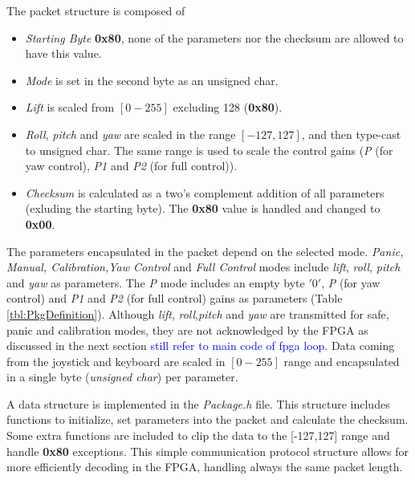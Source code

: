 \documentclass{article}
\newcommand\todo[1]{\textcolor{blue}{#1}} %
\begin{document}
The packet structure is composed of
\begin{itemize}

\item{\emph{Starting Byte} \textbf{0x80}, none of the parameters nor the checksum are allowed to have this value.}

\item{\emph{Mode} is set in the second byte as an unsigned char.}

\item{\emph{Lift} is scaled from $[0-255]$ excluding 128 (\textbf{0x80}).}

\item{\emph{Roll}, \emph{pitch} and \emph{yaw} are scaled in the range $[-127,127]$, and then type-cast to unsigned char. The same range is used to scale the control gains (\emph{P} (for yaw control), \emph{P1} and \emph{P2} (for full control)).}

\item{\emph{Checksum} is calculated as a two's complement addition of all parameters (exluding the starting byte). The \textbf{0x80} value is handled and changed to \textbf{0x00}.}

\end{itemize}

The parameters encapsulated in the packet depend on the selected mode. \emph{Panic, Manual, Calibration,Yaw Control} and \emph{Full Control} modes include \emph{lift}, \emph{roll}, \emph{pitch} and \emph{yaw} as parameters. The \emph{P} mode includes an empty byte $'0'$, \emph{P} (for yaw control) and \emph{P1} and \emph{P2} (for full control) gains as parameters (Table \ref{tbl:PkgDefinition}). Although \emph{lift}, \emph{roll},\emph{pitch} and \emph{yaw} are transmitted for safe, panic and calibration modes, they are not acknowledged by the FPGA as discussed in the next section \todo{still refer to main code of fpga loop}. Data coming from the joystick and keyboard are scaled in $[0-255]$ range and encapsulated in a single byte (\emph{unsigned char}) per parameter.

A data structure is implemented in the \emph{Package.h} file. This structure includes functions to initialize, set parameters into the packet and calculate the checksum. Some extra functions are included to clip the data to the [-127,127] range and handle \textbf{0x80} exceptions. This simple communication protocol structure allows for more efficiently decoding in the FPGA, handling always the same packet length.

\end{document}
